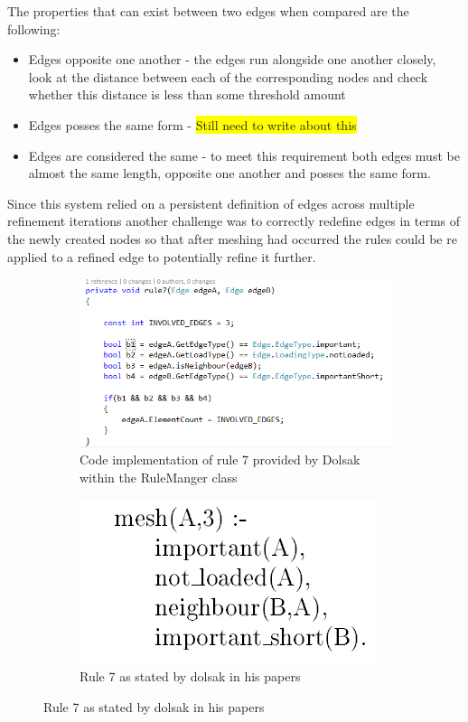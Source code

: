 The properties that can exist between two edges when compared are the following:
\begin{itemize}
\item Edges opposite one another - the edges run alongside one another closely, look at the distance between each of the corresponding nodes and check whether this distance is less than some threshold amount
\item Edges posses the same form - \colorbox{yellow}{Still need to write about this}

\item Edges are considered the same - to meet this requirement both edges must be almost the same length, opposite one another and posses the same form.

\end{itemize}

\noindent
Since this system relied on a persistent definition of edges across multiple refinement iterations another challenge was to correctly redefine edges in terms of the newly created nodes so that after meshing had occurred the rules could be re applied to a refined edge to potentially refine it further.

\begin{figure}[!h]
\centering
\begin{subfigure}{.5\textwidth}
  \centering
  \includegraphics[width=0.9\linewidth]{../Graphics/Rule7Implementation.png}
  \caption{Code implementation of rule 7 provided by Dolsak within the RuleManger class}
  \label{fig:sub1}
\end{subfigure}%
\begin{subfigure}{.5\textwidth}
  \centering
  \includegraphics[width=0.7\linewidth]{../Graphics/Rule7Dolsak.png}
  \caption{Rule 7 as stated by dolsak in his papers \cite{appOfILPToFEMeshDesign}}
  \label{fig:sub2}
\end{subfigure}
\label{fig:test}
\end{figure}


